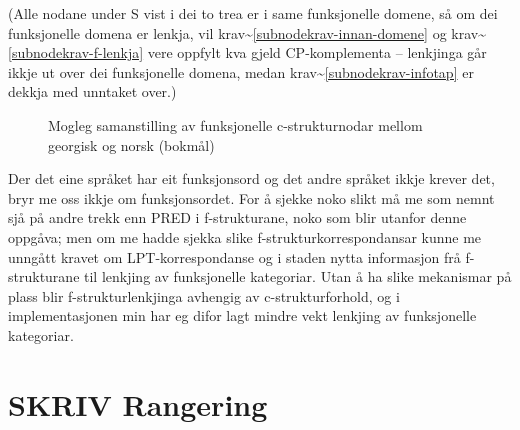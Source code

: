 \documentclass[11pt,a4paper,oneside,draft]{book}
\begin{document}
(Alle nodane under S vist i dei to trea er i same funksjonelle domene,
så om dei funksjonelle domena er lenkja, vil
krav\~{}\ref{subnodekrav-innan-domene} og krav\~{}\ref{subnodekrav-f-lenkja}
vere oppfylt kva gjeld CP-komplementa -- lenkjinga går ikkje ut over
dei funksjonelle domena, medan krav\~{}\ref{subnodekrav-infotap} er
dekkja med unntaket over.)

  \begin{figure}[htp]
   \centering
  
  \caption{Mogleg samanstilling av funksjonelle c-strukturnodar mellom georgisk og norsk (bokmål)}
   \label{fig:fnord}
  \end{figure}

Der det eine språket har eit funksjonsord og det andre språket ikkje
krever det, bryr me oss ikkje om funksjonsordet. For å sjekke noko
slikt må me som nemnt sjå på andre trekk enn PRED i f-strukturane,
noko som blir utanfor denne oppgåva; men om me hadde sjekka slike
f-strukturkorrespondansar kunne me unngått kravet om
LPT-korrespondanse og i staden nytta informasjon frå f-strukturane til
lenkjing av funksjonelle kategoriar. Utan å ha slike mekanismar på
plass blir f-strukturlenkjinga avhengig av c-strukturforhold, og i
implementasjonen min har eg difor lagt mindre vekt lenkjing av
funksjonelle kategoriar.

\section{\textbf{SKRIV} Rangering}
\label{sec-3.11}
\end{document}
